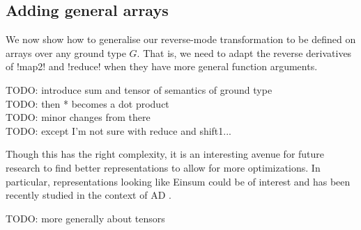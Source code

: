 \subsection{Adding general arrays} %
\label{sub:Adding general arrays}

We now show how to generalise our reverse-mode transformation to be defined on arrays over any ground type $G$.
That is, we need to adapt the reverse derivatives of !map2! and !reduce! when they have more general function arguments.


TODO: introduce sum and tensor of semantics of ground type\\
TODO: then * becomes a dot product\\
TODO: minor changes from there\\
TODO: except I'm not sure with reduce and shift1...

Though this has the right complexity, it is an interesting avenue for future research to find
better representations to allow for more optimizations. 
In particular, representations looking like Einsum \cite{van2011numpy} could be of interest 
and has been recently studied in the context of AD \cite{laue2018computing,laue2020simple}.

TODO: more generally about tensors \cite{liao2019differentiable,bernstein2020differentiating}

